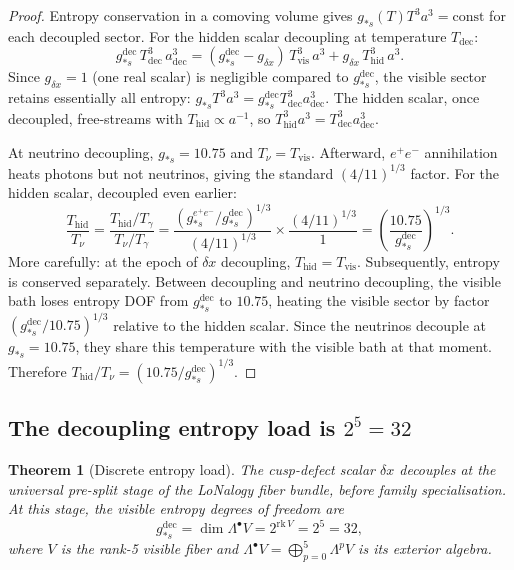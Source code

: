 \documentclass[12pt]{article}
\theoremstyle{plain}
\newtheorem{theorem}{Theorem}[section]
\theoremstyle{definition}
\numberwithin{equation}{section}
\newcommand{\vis}{\mathrm{vis}}
\newcommand{\hid}{\mathrm{hid}}
\newcommand{\dec}{\mathrm{dec}}
\begin{document}
\begin{proof}
Entropy conservation in a comoving volume gives
$g_{*s}(T)T^3 a^3=\mathrm{const}$ for each decoupled sector.
For the hidden scalar decoupling at temperature $T_{\dec}$:
\begin{equation}
g_{*s}^{\dec}\,T_{\dec}^3\,a_{\dec}^3 = (g_{*s}^{\dec}-g_{\delta x})\,T_{\vis}^3\,a^3 + g_{\delta x}\,T_{\hid}^3\,a^3.
\end{equation}
Since $g_{\delta x}=1$ (one real scalar) is negligible compared to $g_{*s}^{\dec}$,
the visible sector retains essentially all entropy: $g_{*s}T^3a^3=g_{*s}^{\dec}T_{\dec}^3a_{\dec}^3$.
The hidden scalar, once decoupled, free-streams with $T_{\hid}\propto a^{-1}$,
so $T_{\hid}^3 a^3=T_{\dec}^3 a_{\dec}^3$.

At neutrino decoupling, $g_{*s}=10.75$ and $T_\nu=T_{\vis}$.  Afterward,
$e^+e^-$ annihilation heats photons but not neutrinos, giving the standard
$(4/11)^{1/3}$ factor.  For the hidden scalar, decoupled even earlier:
\begin{equation}
\frac{T_{\hid}}{T_\nu} = \frac{T_{\hid}/T_\gamma}{T_\nu/T_\gamma}
= \frac{(g_{*s}^{e^+e^-}/g_{*s}^{\dec})^{1/3}}{(4/11)^{1/3}}
\times\frac{(4/11)^{1/3}}{1}
= \left(\frac{10.75}{g_{*s}^{\dec}}\right)^{1/3}.
\end{equation}
More carefully: at the epoch of $\delta x$ decoupling, $T_{\hid}=T_{\vis}$.
Subsequently, entropy is conserved separately.  Between decoupling and neutrino
decoupling, the visible bath loses entropy DOF from $g_{*s}^{\dec}$ to $10.75$,
heating the visible sector by factor $(g_{*s}^{\dec}/10.75)^{1/3}$ relative to
the hidden scalar.  Since the neutrinos decouple at $g_{*s}=10.75$, they share
this temperature with the visible bath at that moment.  Therefore
$T_{\hid}/T_\nu=(10.75/g_{*s}^{\dec})^{1/3}$.
\end{proof}

\subsection{The decoupling entropy load is $2^5=32$}

\begin{theorem}[Discrete entropy load]\label{thm:gstar}
The cusp-defect scalar $\delta x$ decouples at the universal pre-split stage
of the LoNalogy fiber bundle, before family specialisation.  At this stage,
the visible entropy degrees of freedom are
\begin{equation}\label{eq:gstar}
\boxed{g_{*s}^{\dec} = \dim\Lambda^\bullet V = 2^{\mathrm{rk}\,V} = 2^5 = 32,}
\end{equation}
where $V$ is the rank-5 visible fiber and $\Lambda^\bullet V=\bigoplus_{p=0}^{5}\Lambda^p V$
is its exterior algebra.
\end{theorem}
\end{document}
